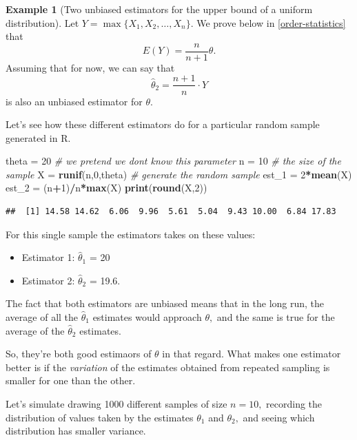\documentclass[
]{book}
\newenvironment{Shaded}{\begin{snugshade}}{\end{snugshade}}
\newcommand{\CommentTok}[1]{\textcolor[rgb]{0.56,0.35,0.01}{\textit{#1}}}
\newcommand{\DecValTok}[1]{\textcolor[rgb]{0.00,0.00,0.81}{#1}}
\newcommand{\FunctionTok}[1]{\textcolor[rgb]{0.13,0.29,0.53}{\textbf{#1}}}
\newcommand{\NormalTok}[1]{#1}
\newcommand{\OtherTok}[1]{\textcolor[rgb]{0.56,0.35,0.01}{#1}}
\newcommand{\SpecialCharTok}[1]{\textcolor[rgb]{0.81,0.36,0.00}{\textbf{#1}}}
\providecommand{\tightlist}{%
  \setlength{\itemsep}{0pt}\setlength{\parskip}{0pt}}
\theoremstyle{definition}
\theoremstyle{definition}
\newtheorem{example}{Example}[chapter]
\theoremstyle{definition}
\theoremstyle{definition}
\theoremstyle{remark}
\begin{document}
\begin{example}[Two unbiased estimators for the upper bound of a uniform distribution]
Let \(Y = \max\{X_1, X_2, \ldots, X_n\}.\) We prove below in \ref{order-statistics} that \[E(Y) = \frac{n}{n+1}\theta.\]
Assuming that for now, we can say that \[\hat{\theta}_2 = \frac{n+1}{n}\cdot Y \tag{unbiased estimator 2}\] is also an unbiased estimator for \(\theta\).

Let's see how these different estimators do for a particular random sample generated in R.

\begin{Shaded}
\begin{Highlighting}[]
\NormalTok{theta }\OtherTok{=} \DecValTok{20} \CommentTok{\# we pretend we don\textquotesingle{}t know this parameter}
\NormalTok{n }\OtherTok{=} \DecValTok{10} \CommentTok{\# the size of the sample}
\NormalTok{X }\OtherTok{=} \FunctionTok{runif}\NormalTok{(n,}\DecValTok{0}\NormalTok{,theta) }\CommentTok{\# generate the random sample}
\NormalTok{est\_1 }\OtherTok{=} \DecValTok{2}\SpecialCharTok{*}\FunctionTok{mean}\NormalTok{(X)}
\NormalTok{est\_2 }\OtherTok{=}\NormalTok{ (n}\SpecialCharTok{+}\DecValTok{1}\NormalTok{)}\SpecialCharTok{/}\NormalTok{n}\SpecialCharTok{*}\FunctionTok{max}\NormalTok{(X)}
\FunctionTok{print}\NormalTok{(}\FunctionTok{round}\NormalTok{(X,}\DecValTok{2}\NormalTok{))}
\end{Highlighting}
\end{Shaded}

\begin{verbatim}
##  [1] 14.58 14.62  6.06  9.96  5.61  5.04  9.43 10.00  6.84 17.83
\end{verbatim}

For this single sample the estimators takes on these values:

\begin{itemize}
\tightlist
\item
  Estimator 1: \(\hat{\theta}_1\) = 20
\item
  Estimator 2: \(\hat{\theta}_2\) = 19.6.
\end{itemize}

The fact that both estimators are unbiased means that in the long run, the average of all the \(\hat{\theta}_1\) estimates would approach \(\theta,\) and the same is true for the average of the \(\hat{\theta}_2\) estimates.

So, they're both good estimaors of \(\theta\) in that regard. What makes one estimator better is if the \emph{variation} of the estimates obtained from repeated sampling is smaller for one than the other.

Let's simulate drawing 1000 different samples of size \(n = 10,\) recording the distribution of values taken by the estimates \(\theta_1\) and \(\theta_2,\) and seeing which distribution has smaller variance.


\end{example}
\end{document}
